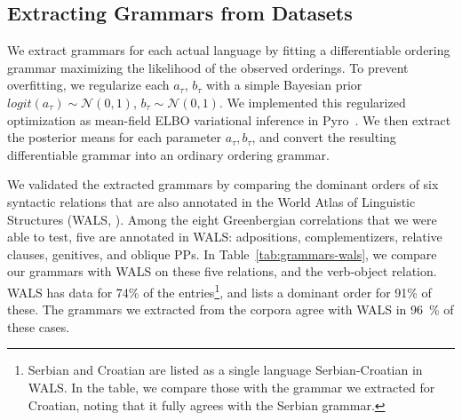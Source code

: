 \documentclass[10pt,twoside,lineno]{article}
\begin{document}
\subsection{Extracting Grammars from Datasets}\label{sec:extract-grammars}
We extract grammars for each actual language by fitting a differentiable ordering grammar maximizing the likelihood of the observed orderings.
To prevent overfitting, we regularize each $a_\tau$, $b_\tau$ with a simple Bayesian prior $logit(a_\tau) \sim \mathcal{N}(0,1)$, $b_\tau \sim \mathcal{N}(0,1)$.
We implemented this regularized optimization as mean-field ELBO variational inference in Pyro~\cite{bingham2018pyro}.
We then extract the posterior means for each parameter $a_\tau, b_\tau$, and convert the resulting differentiable grammar into an ordinary ordering grammar.




We validated the extracted grammars by comparing the dominant orders of six syntactic relations that are also annotated in the World Atlas of Linguistic Structures (WALS, \cite{haspelmath2005world}).
Among the eight Greenbergian correlations that we were able to test, five are annotated in WALS: adpositions, complementizers, relative clauses, genitives, and oblique PPs.
In Table~\ref{tab:grammars-wals}, we compare our grammars with WALS on these five relations, and the verb-object relation.
WALS has data for 74\% of the entries\footnote{Serbian and Croatian are listed as a single language Serbian-Croatian in WALS. In the table, we compare those with the grammar we extracted for Croatian, noting that it fully agrees with the Serbian grammar.}, and lists a dominant order for 91\% of these.
The grammars we extracted from the corpora agree with WALS in 96~\%  of these cases.
\end{document}
